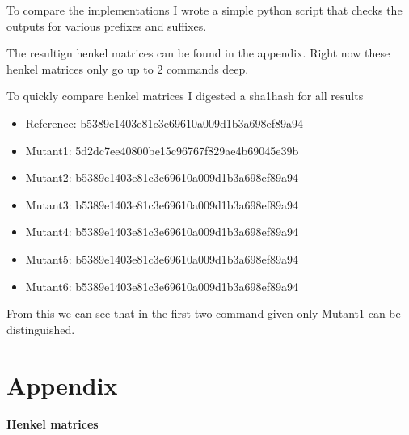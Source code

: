 \documentclass[11pt,a4paper]{article}
\begin{document}

To compare the implementations I wrote a simple python script that
checks the outputs for various prefixes and suffixes.

The resultign henkel matrices can be found in the appendix. Right now
these henkel matrices only go up to 2 commands deep.

To quickly compare henkel matrices I digested a sha1hash for all results

\begin{itemize}
\item Reference: b5389e1403e81c3e69610a009d1b3a698ef89a94
\item Mutant1: 5d2dc7ee40800be15c96767f829ae4b69045e39b
\item Mutant2: b5389e1403e81c3e69610a009d1b3a698ef89a94
\item Mutant3: b5389e1403e81c3e69610a009d1b3a698ef89a94
\item Mutant4: b5389e1403e81c3e69610a009d1b3a698ef89a94
\item Mutant5: b5389e1403e81c3e69610a009d1b3a698ef89a94
\item Mutant6: b5389e1403e81c3e69610a009d1b3a698ef89a94
\end{itemize}

From this we can see that in the first two command given only Mutant1
can be distinguished.


\part{Appendix}
\subsection{Henkel matrices}
\end{document}
